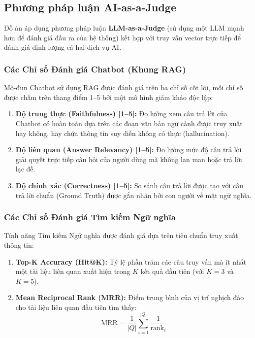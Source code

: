 \subsection{Phương pháp luận AI-as-a-Judge}

Đồ án áp dụng phương pháp luận \textbf{LLM-as-a-Judge} (sử dụng một LLM mạnh hơn để đánh giá đầu ra của hệ thống) kết hợp với truy vấn vector trực tiếp để đánh giá định lượng cả hai dịch vụ AI.


\subsubsection{Các Chỉ số Đánh giá Chatbot (Khung RAG)}

Mô-đun Chatbot sử dụng RAG được đánh giá trên ba chỉ số cốt lõi, mỗi chỉ số được chấm trên thang điểm 1--5 bởi một mô hình giám khảo độc lập:

\begin{enumerate}
    \item \textbf{Độ trung thực (Faithfulness) [1--5]:} Đo lường xem câu trả lời của Chatbot có hoàn toàn dựa trên các đoạn văn bản ngữ cảnh được truy xuất hay không, hay chứa thông tin suy diễn không có thực (hallucination).
    \item \textbf{Độ liên quan (Answer Relevancy) [1--5]:} Đo lường mức độ câu trả lời giải quyết trực tiếp câu hỏi của người dùng mà không lan man hoặc trả lời lạc đề.
    \item \textbf{Độ chính xác (Correctness) [1--5]:} So sánh câu trả lời được tạo với câu trả lời chuẩn (Ground Truth) được gắn nhãn bởi con người về mặt ngữ nghĩa.
\end{enumerate}

\subsubsection{Các Chỉ số Đánh giá Tìm kiếm Ngữ nghĩa}

Tính năng Tìm kiếm Ngữ nghĩa được đánh giá dựa trên tiêu chuẩn truy xuất thông tin:

\begin{enumerate}
    \item \textbf{Top-K Accuracy (Hit@K):} Tỷ lệ phần trăm các câu truy vấn mà ít nhất một tài liệu liên quan xuất hiện trong $K$ kết quả đầu tiên (với $K=3$ và $K=5$).
    \item \textbf{Mean Reciprocal Rank (MRR):} Điểm trung bình của vị trí nghịch đảo cho tài liệu liên quan đầu tiên tìm thấy:
    \begin{equation}
    \text{MRR} = \frac{1}{|Q|} \sum_{i=1}^{|Q|} \frac{1}{\text{rank}_i}
    \end{equation}
\end{enumerate}

